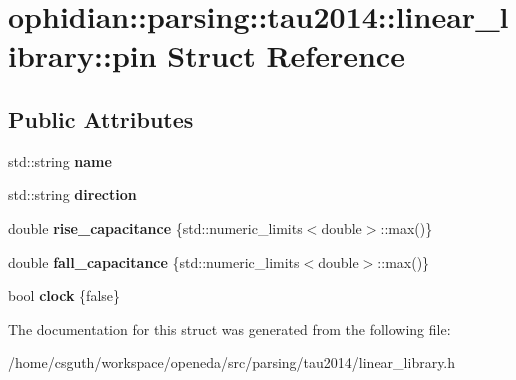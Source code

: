 \hypertarget{structophidian_1_1parsing_1_1tau2014_1_1linear__library_1_1pin}{\section{ophidian\-:\-:parsing\-:\-:tau2014\-:\-:linear\-\_\-library\-:\-:pin Struct Reference}
\label{structophidian_1_1parsing_1_1tau2014_1_1linear__library_1_1pin}
}
\subsection*{Public Attributes}
\begin{DoxyCompactItemize}
\item 
\hypertarget{structophidian_1_1parsing_1_1tau2014_1_1linear__library_1_1pin_a763b21631612e9654e5f1da3741c0fbe}{std\-::string {\bfseries name}}\label{structophidian_1_1parsing_1_1tau2014_1_1linear__library_1_1pin_a763b21631612e9654e5f1da3741c0fbe}

\item 
\hypertarget{structophidian_1_1parsing_1_1tau2014_1_1linear__library_1_1pin_adccffe7e7be313eb9afe9406d8b22100}{std\-::string {\bfseries direction}}\label{structophidian_1_1parsing_1_1tau2014_1_1linear__library_1_1pin_adccffe7e7be313eb9afe9406d8b22100}

\item 
\hypertarget{structophidian_1_1parsing_1_1tau2014_1_1linear__library_1_1pin_aafb0cb09aa4bb4c977312cae52c1e98d}{double {\bfseries rise\-\_\-capacitance} \{std\-::numeric\-\_\-limits$<$double$>$\-::max()\}}\label{structophidian_1_1parsing_1_1tau2014_1_1linear__library_1_1pin_aafb0cb09aa4bb4c977312cae52c1e98d}

\item 
\hypertarget{structophidian_1_1parsing_1_1tau2014_1_1linear__library_1_1pin_ace406d798b6ad8d4df6a2255551630ae}{double {\bfseries fall\-\_\-capacitance} \{std\-::numeric\-\_\-limits$<$double$>$\-::max()\}}\label{structophidian_1_1parsing_1_1tau2014_1_1linear__library_1_1pin_ace406d798b6ad8d4df6a2255551630ae}

\item 
\hypertarget{structophidian_1_1parsing_1_1tau2014_1_1linear__library_1_1pin_a7caf7f6cc110b11fad0a5b81c3cd9b57}{bool {\bfseries clock} \{false\}}\label{structophidian_1_1parsing_1_1tau2014_1_1linear__library_1_1pin_a7caf7f6cc110b11fad0a5b81c3cd9b57}

\end{DoxyCompactItemize}


The documentation for this struct was generated from the following file\-:\begin{DoxyCompactItemize}
\item 
/home/csguth/workspace/openeda/src/parsing/tau2014/linear\-\_\-library.\-h\end{DoxyCompactItemize}
